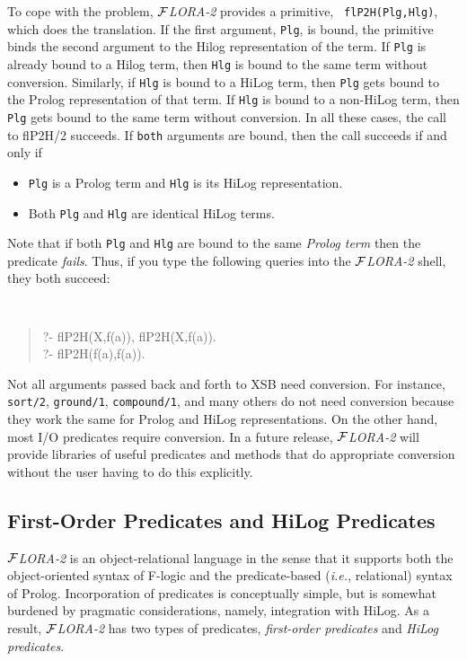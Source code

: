 \documentclass[11pt]{article}
\newcommand{\FLORA}{{\mbox{${\cal F}${\small\it LORA}\rm\emph{-2}}}\xspace}
\newcommand{\fl}{\mbox{F-logic}\xspace}
\begin{document}
To cope with the problem, \FLORA provides a primitive, {\tt
  flP2H(Plg,Hlg)}, which does the translation. If the first argument,
{\tt Plg}, is bound, the primitive binds the second argument to the
Hilog representation of the term. If {\tt Plg} is already bound to a
Hilog term, then {\tt Hlg} is bound to the same term without conversion.
Similarly, if {\tt Hlg} is bound to a HiLog term, then {\tt Plg} gets
bound to the Prolog representation of that term. If {\tt Hlg} is bound to
a non-HiLog term, then {\tt Plg} gets bound to the same term without
conversion. In all these cases, the call to flP2H/2 succeeds. If {\tt both}
arguments are bound, then the call succeeds if and only if
\begin{itemize}
\item {\tt Plg} is a Prolog term and {\tt Hlg} is its HiLog
  representation.
\item Both {\tt Plg} and {\tt Hlg} are identical HiLog terms.
\end{itemize}
Note that if both {\tt Plg} and {\tt Hlg} are bound to the same
\emph{Prolog term} then the predicate \emph{fails}. Thus, if you type the
following queries into the \FLORA shell, they both succeed:
{\tt
\begin{quote}
  ?- flP2H(X,f(a)), flP2H(X,f(a)).  \\
  ?- flP2H(f(a),f(a)).
\end{quote}
}


Not all arguments passed back and forth to XSB need conversion. For
instance, {\tt sort/2}, {\tt ground/1}, {\tt compound/1}, and many others
do not need conversion because they work the same for Prolog and HiLog
representations. On the other hand, most I/O predicates require conversion.
In a future release, \FLORA will provide libraries of useful predicates and
methods that do appropriate conversion without the user having to do
this explicitly.


\subsection{First-Order Predicates and HiLog Predicates}
\label{sec:flora-modules-predicates}

\FLORA is an object-relational language in the sense that it supports both
the object-oriented syntax of \fl and the predicate-based ({\it i.e.},
relational) syntax of Prolog. Incorporation of predicates is conceptually
simple, but is somewhat burdened by pragmatic considerations, namely,
integration with HiLog. As a result, \FLORA has two types of predicates,
{\em first-order predicates\/} and \emph{HiLog predicates}. 
\end{document}
